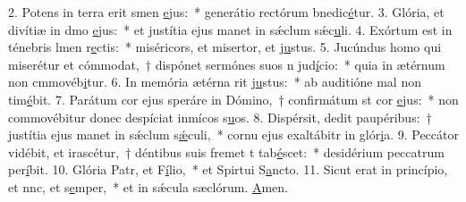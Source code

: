 2. Potens in terra erit smen \uline{e}jus:~* generátio rectórum bnedic\uline{é}tur.
3. Glória, et divítiæ in dmo \uline{e}jus:~* et justítia ejus manet in sǽclum sǽc\uline{u}li.
4. Exórtum est in ténebris lmen r\uline{e}ctis:~* miséricors, et misertor, et j\uline{u}stus.
5. Jucúndus homo qui miserétur et cómmodat,~† dispónet sermónes suos n jud\uline{í}cio:~* quia in ætérnum non cmmovéb\uline{i}tur.
6. In memória ætérna rit j\uline{u}stus:~* ab auditióne mal non tim\uline{é}bit.
7. Parátum cor ejus speráre in Dómino,~† confirmátum st cor \uline{e}jus:~* non commovébitur donec despíciat inmícos s\uline{u}os.
8. Dispérsit, dedit paupéribus:~† justítia ejus manet in sǽclum s\uline{ǽ}culi,~* cornu ejus exaltábitr in glór\uline{i}a.
9. Peccátor vidébit, et irascétur,~† déntibus suis fremet t tab\uline{é}scet:~* desidérium peccatrum per\uline{í}bit.
10. Glória Patr, et F\uline{í}lio,~* et Spirtui S\uline{a}ncto.
11. Sicut erat in princípio, et nnc, et s\uline{e}mper,~* et in sǽcula sæclórum. \uline{A}men.

